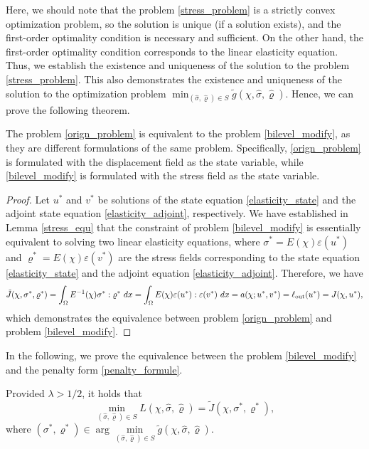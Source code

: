 \documentclass{amsart}
\begin{document}
Here, we should note that the problem \eqref{stress_problem} is a strictly convex optimization problem, so the solution is unique (if a solution exists), and the first-order optimality condition is necessary and sufficient. On the other hand, the first-order optimality condition corresponds to the linear elasticity equation. Thus, we establish the existence and uniqueness of the solution to the problem \eqref{stress_problem}. This also demonstrates the existence and uniqueness of the solution to the optimization problem \(\min_{(\hat{\sigma}, \hat{\varrho})\in S} \tilde{g}(\chi,\hat{\sigma},\hat{\varrho})\). Hence, we can prove the following theorem.
\begin{theorem}
    The problem \eqref{orign_problem} is equivalent to the problem \eqref{bilevel_modify}, as they are different formulations of the same problem. Specifically, \eqref{orign_problem} is formulated with the displacement field as the state variable, while \eqref{bilevel_modify} is formulated with the stress field as the state variable.
\end{theorem}
\begin{proof}
    Let $u^*$ and $v^*$ be solutions of the state equation \eqref{elasticity_state} and the adjoint state equation \eqref{elasticity_adjoint}, respectively. We have established in Lemma \ref{stress_equ} that the constraint of problem \eqref{bilevel_modify} is essentially equivalent to solving two linear elasticity equations, where \(\sigma^*=E(\chi)\varepsilon(u^*)\) and \(\varrho^*=E(\chi)\varepsilon(v^*)\) are the stress fields corresponding to the state equation \eqref{elasticity_state} and the adjoint equation \eqref{elasticity_adjoint}. Therefore, we have
    \begin{align*}
        \tilde{J}(\chi,\sigma^*,\varrho^*)=\int_\Omega E^{-1}(\chi)\sigma^*:\varrho^*\ dx
        =\int_\Omega E(\chi)\varepsilon(u^*):\varepsilon(v^*)\ dx
        =a(\chi;u^*,v^*)
        =\ell_{\rm out}(u^*)
        =J(\chi,u^*),
    \end{align*}
    which demonstrates the equivalence between problem \eqref{orign_problem} and problem \eqref{bilevel_modify}.
\end{proof}
In the following, we prove the equivalence between the problem \eqref{bilevel_modify} and the penalty form \eqref{penalty_formule}.
\begin{theorem}
    Provided $ \lambda > 1/2 $, it holds that 
    \begin{equation} 
        \min_ {(\hat\sigma,\hat\varrho)\in S}L(\chi,\hat\sigma,\hat\varrho) = \tilde{J}(\chi,\sigma^*,\varrho^*),
    \end{equation}
    where $(\sigma^*,\varrho^*)\in \arg\min\limits_{(\hat{\sigma},\hat{\varrho})\in S}\tilde{g}(\chi,\hat\sigma,\hat\varrho)$.
\end{theorem}
\end{document}
